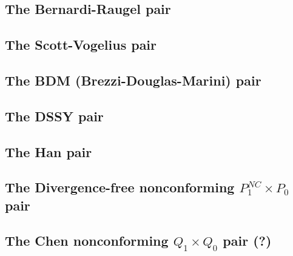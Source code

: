 \subsection{The Bernardi-Raugel pair} \label{ss:bernardi_raugel}


\subsection{The Scott-Vogelius pair} \label{ss:scott_vogelius}


\subsection{The BDM (Brezzi-Douglas-Marini) pair} \label{ss:bdm}


\subsection{The DSSY pair} \label{ss:pair_dssy2D}


\subsection{The Han pair} \label{ss:han}


\subsection{The Divergence-free nonconforming $P_1^{NC}\times P_0$ pair} \label{ss:p1ncp0}


\subsection{The Chen nonconforming ${ Q}_1\times Q_0$ pair (?)} \label{ss:chenq0}


